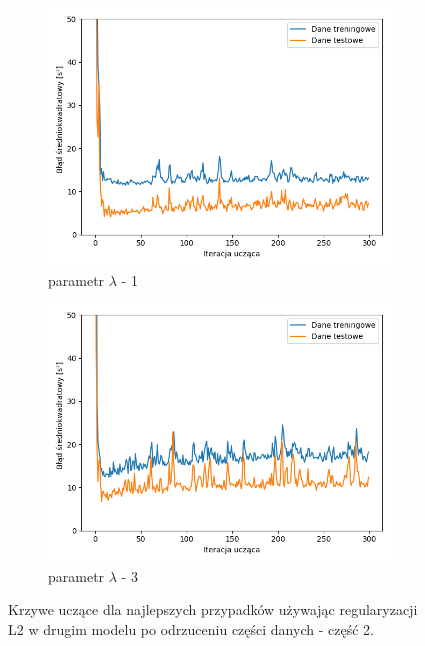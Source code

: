 \documentclass[12pt]{aghdpl}
\begin{document}
		\begin{figure}[h]
			\centering
		 	\begin{subfigure}{.8\linewidth}
		 		\includegraphics[width =\linewidth]{wykresy/7_badanie_danych/l2/regularyzacja_1_wykres_uczenia.png}
		 		\caption{parametr $\lambda$ - 1}
		 	\end{subfigure}
		 	\begin{subfigure}{.8\linewidth}
		 		\includegraphics[width =\linewidth]{wykresy/7_badanie_danych/l2/regularyzacja_3_wykres_uczenia.png}
		 		\caption{parametr $\lambda$ - 3}
		 	\end{subfigure}
	 	
 			\caption{Krzywe uczące dla najlepszych przypadków używając regularyzacji L2 w drugim modelu po odrzuceniu części danych - część 2.}
			\label{fig: drugi_model_przy_regularyzacji_l2_po_odrzuceniu_czesci_danych_wykresy_uczenia_2}
		\end{figure}
		
\end{document}
